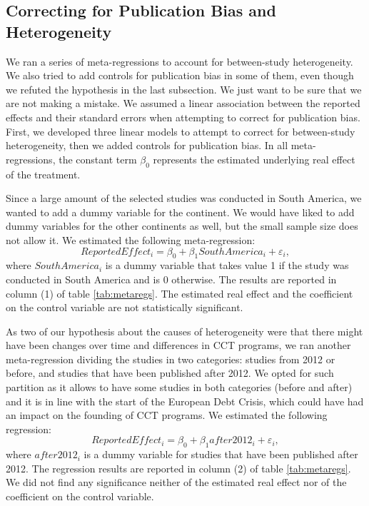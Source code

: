 \documentclass[a4paper, 10pt]{article}
\begin{document}

\subsection{Correcting for Publication Bias and Heterogeneity}
We ran a series of meta-regressions to account for between-study heterogeneity. We also tried to add controls for publication bias in some of them, even though we refuted the hypothesis in the last subsection. We just want to be sure that we are not making a mistake. We assumed a linear association between the reported effects and their standard errors when attempting to correct for publication bias. First, we developed three linear models to attempt to correct for between-study heterogeneity, then we added controls for publication bias. In all meta-regressions, the constant term $\beta_0$ represents the estimated underlying real effect of the treatment.

Since a large amount of the selected studies was conducted in South America, we wanted to add a dummy variable for the continent. We would have liked to add dummy variables for the other continents as well, but the small sample size does not allow it. We estimated the following meta-regression:
\begin{equation}
    ReportedEffect_i = \beta_0 + \beta_1 SouthAmerica_i + \varepsilon_i,
\end{equation}
where $SouthAmerica_i$ is a dummy variable that takes value 1 if the study was conducted in South America and is 0 otherwise. The results are reported in column (1) of table \ref{tab:metaregs}. The estimated real effect and the coefficient on the control variable are not statistically significant.

As two of our hypothesis about the causes of heterogeneity were that there might have been changes over time and differences in CCT programs, we ran another meta-regression dividing the studies in two categories: studies from 2012 or before, and studies that have been published after 2012. We opted for such partition as it allows to have some studies in both categories (before and after) and it is in line with the start of the European Debt Crisis, which could have had an impact on the founding of CCT programs. We estimated the following regression:
\begin{equation}
    ReportedEffect_i = \beta_0 + \beta_1 after2012_i + \varepsilon_i,
\end{equation}
where $after2012_i$ is a dummy variable for studies that have been published after 2012. The regression results are reported in column (2) of table \ref{tab:metaregs}. We did not find any significance neither of the estimated real effect nor of the coefficient on the control variable.
\end{document}
